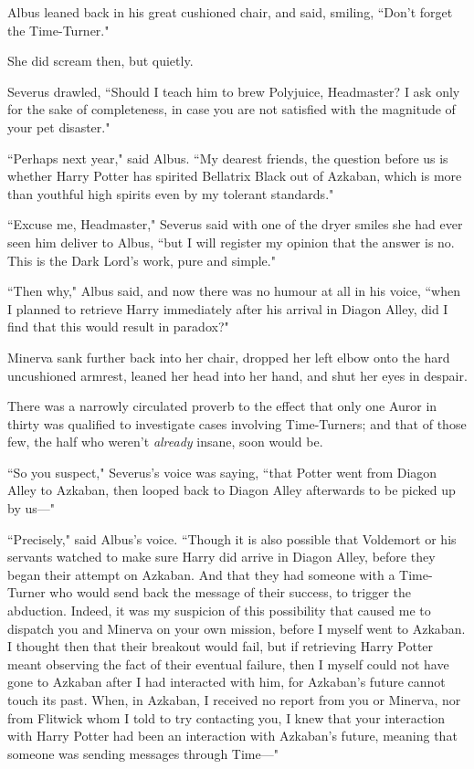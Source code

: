 Albus leaned back in his great cushioned chair, and said, smiling, ``Don't forget the Time-Turner."

She did scream then, but quietly.

Severus drawled, ``Should I teach him to brew Polyjuice, Headmaster? I ask only for the sake of completeness, in case you are not satisfied with the magnitude of your pet disaster."

``Perhaps next year," said Albus. ``My dearest friends, the question before us is whether Harry Potter has spirited Bellatrix Black out of Azkaban, which is more than youthful high spirits even by my tolerant standards."

``Excuse me, Headmaster," Severus said with one of the dryer smiles she had ever seen him deliver to Albus, ``but I will register my opinion that the answer is no. This is the Dark Lord's work, pure and simple."

``Then why," Albus said, and now there was no humour at all in his voice, ``when I planned to retrieve Harry immediately after his arrival in Diagon Alley, did I find that this would result in paradox?"

Minerva sank further back into her chair, dropped her left elbow onto the hard uncushioned armrest, leaned her head into her hand, and shut her eyes in despair.

There was a narrowly circulated proverb to the effect that only one Auror in thirty was qualified to investigate cases involving Time-Turners; and that of those few, the half who weren't \emph{already} insane, soon would be.

``So you suspect," Severus's voice was saying, ``that Potter went from Diagon Alley to Azkaban, then looped back to Diagon Alley afterwards to be picked up by us—"

``Precisely," said Albus's voice. ``Though it is also possible that Voldemort or his servants watched to make sure Harry did arrive in Diagon Alley, before they began their attempt on Azkaban. And that they had someone with a Time-Turner who would send back the message of their success, to trigger the abduction. Indeed, it was my suspicion of this possibility that caused me to dispatch you and Minerva on your own mission, before I myself went to Azkaban. I thought then that their breakout would fail, but if retrieving Harry Potter meant observing the fact of their eventual failure, then I myself could not have gone to Azkaban after I had interacted with him, for Azkaban's future cannot touch its past. When, in Azkaban, I received no report from you or Minerva, nor from Flitwick whom I told to try contacting you, I knew that your interaction with Harry Potter had been an interaction with Azkaban's future, meaning that someone was sending messages through Time—"

